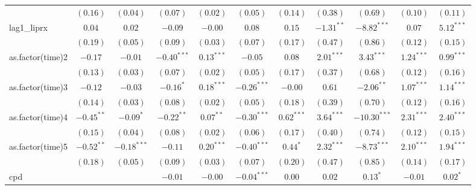 \begin{tabular}{l c c c c c c c c c c}
                 & $(0.16)$      & $(0.04)$      & $(0.07)$      & $(0.02)$      & $(0.05)$      & $(0.14)$       & $(0.38)$      & $(0.69)$       & $(0.10)$       & $(0.11)$      \\
lag1\_liprx      & $0.04$        & $0.02$        & $-0.09$       & $-0.00$       & $0.08$        & $0.15$         & $-1.31^{**}$  & $-8.82^{***}$  & $0.07$         & $5.12^{***}$  \\
                 & $(0.19)$      & $(0.05)$      & $(0.09)$      & $(0.03)$      & $(0.07)$      & $(0.17)$       & $(0.47)$      & $(0.86)$       & $(0.12)$       & $(0.15)$      \\
as.factor(time)2 & $-0.17$       & $-0.01$       & $-0.40^{***}$ & $0.13^{***}$  & $-0.05$       & $0.08$         & $2.01^{***}$  & $3.43^{***}$   & $1.24^{***}$   & $0.99^{***}$  \\
                 & $(0.13)$      & $(0.03)$      & $(0.07)$      & $(0.02)$      & $(0.05)$      & $(0.17)$       & $(0.37)$      & $(0.68)$       & $(0.12)$       & $(0.16)$      \\
as.factor(time)3 & $-0.12$       & $-0.03$       & $-0.16^{*}$   & $0.18^{***}$  & $-0.26^{***}$ & $-0.00$        & $0.61$        & $-2.06^{**}$   & $1.07^{***}$   & $1.14^{***}$  \\
                 & $(0.14)$      & $(0.03)$      & $(0.08)$      & $(0.02)$      & $(0.05)$      & $(0.18)$       & $(0.39)$      & $(0.70)$       & $(0.12)$       & $(0.16)$      \\
as.factor(time)4 & $-0.45^{**}$  & $-0.09^{*}$   & $-0.22^{**}$  & $0.07^{**}$   & $-0.30^{***}$ & $0.62^{***}$   & $3.64^{***}$  & $-10.30^{***}$ & $2.31^{***}$   & $2.40^{***}$  \\
                 & $(0.15)$      & $(0.04)$      & $(0.08)$      & $(0.02)$      & $(0.06)$      & $(0.17)$       & $(0.40)$      & $(0.74)$       & $(0.12)$       & $(0.15)$      \\
as.factor(time)5 & $-0.52^{**}$  & $-0.18^{***}$ & $-0.11$       & $0.20^{***}$  & $-0.40^{***}$ & $0.44^{*}$     & $2.32^{***}$  & $-8.73^{***}$  & $2.10^{***}$   & $1.94^{***}$  \\
                 & $(0.18)$      & $(0.05)$      & $(0.09)$      & $(0.03)$      & $(0.07)$      & $(0.20)$       & $(0.47)$      & $(0.85)$       & $(0.14)$       & $(0.17)$      \\
cpd              &               &               & $-0.01$       & $-0.00$       & $-0.04^{***}$ & $0.00$         & $0.02$        & $0.13^{*}$     & $-0.01$        & $0.02^{*}$    \\

\end{tabular}
